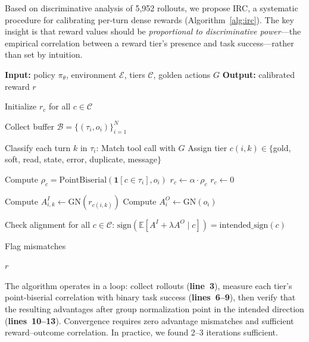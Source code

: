 \documentclass[11pt]{article}
\newcommand{\irc}{\textsc{IRC}}
\begin{document}
Based on discriminative analysis of 5,952 rollouts, we propose \irc{}, a systematic procedure for calibrating per-turn dense rewards (Algorithm~\ref{alg:irc}). The key insight is that reward values should be \emph{proportional to discriminative power}---the empirical correlation between a reward tier's presence and task success---rather than set by intuition.

\begin{algorithm}[t]
\caption{Iterative Reward Calibration (IRC)}
\label{alg:irc}
\begin{algorithmic}[1]
\State \textbf{Input:} policy $\pi_\theta$, environment $\mathcal{E}$, tiers $\mathcal{C}$, golden actions $G$
\State \textbf{Output:} calibrated reward $r$

\State Initialize $r_c$ for all $c \in \mathcal{C}$

\Repeat
    \State Collect buffer $\mathcal{B} = \{(\tau_i, o_i)\}_{i=1}^N$

    \State Classify each turn $k$ in $\tau_i$:
    \State \hspace{1em} Match tool call with $G$
    \State \hspace{1em} Assign tier $c(i,k) \in \{$gold, soft, read, state, error, duplicate, message$\}$

        \State Compute $\rho_c = \text{PointBiserial}(\mathbf{1}[c \in \tau_i], o_i)$
            \State $r_c \leftarrow \alpha \cdot \rho_c$
        \Else
            \State $r_c \leftarrow 0$
        \EndIf
    \EndFor

    \State Compute $A^I_{i,k} \leftarrow \text{GN}(r_{c(i,k)})$
    \State Compute $A^O_i \leftarrow \text{GN}(o_i)$

    \State Check alignment for all $c \in \mathcal{C}$:
    \State \hspace{1em} $\text{sign}(\mathbb{E}[A^I + \lambda A^O \mid c]) = \text{intended\_sign}(c)$

    \State Flag mismatches


\State \Return $r$
\EndProcedure
\end{algorithmic}
\end{algorithm}

The algorithm operates in a loop: collect rollouts (\textbf{line~3}), measure each tier's point-biserial correlation with binary task success (\textbf{lines~6--9}), then verify that the resulting advantages after group normalization point in the intended direction (\textbf{lines~10--13}). Convergence requires zero advantage mismatches and sufficient reward--outcome correlation. In practice, we found 2--3 iterations sufficient.
\end{document}
